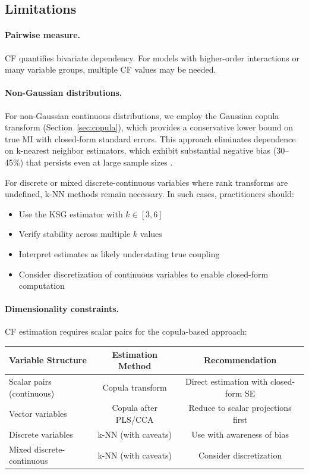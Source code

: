 \documentclass[10pt]{article} %
\theoremstyle{plain}
\theoremstyle{definition}
\begin{document}
\subsection{Limitations}

\paragraph{Pairwise measure.} CF quantifies bivariate dependency. For models with higher-order interactions or many variable groups, multiple CF values may be needed.

\paragraph{Non-Gaussian distributions.} For non-Gaussian continuous distributions, we employ the Gaussian copula transform (Section~\ref{sec:copula}), which provides a conservative lower bound on true MI with closed-form standard errors. This approach eliminates dependence on k-nearest neighbor estimators, which exhibit substantial negative bias (30--45\%) that persists even at large sample sizes \citep{vandenberg2025linfoot}.

For discrete or mixed discrete-continuous variables where rank transforms are undefined, k-NN methods remain necessary. In such cases, practitioners should:
\begin{itemize}
    \item Use the KSG estimator with $k \in [3, 6]$
    \item Verify stability across multiple $k$ values
    \item Interpret estimates as likely understating true coupling
    \item Consider discretization of continuous variables to enable closed-form computation
\end{itemize}

\paragraph{Dimensionality constraints.} CF estimation requires scalar pairs for the copula-based approach:

\begin{center}
\begin{tabular}{lcc}
\toprule
Variable Structure & Estimation Method & Recommendation \\
\midrule
Scalar pairs (continuous) & Copula transform & Direct estimation with closed-form SE \\
Vector variables & Copula after PLS/CCA & Reduce to scalar projections first \\
Discrete variables & k-NN (with caveats) & Use with awareness of bias \\
Mixed discrete-continuous & k-NN (with caveats) & Consider discretization \\
\bottomrule
\end{tabular}
\end{center}
\end{document}
